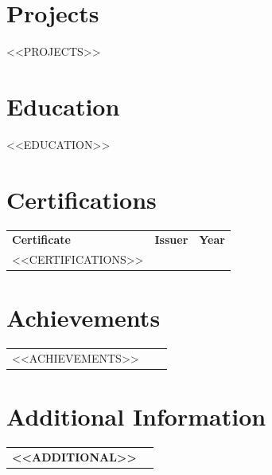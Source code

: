 \documentclass[10pt, a4paper]{article}
\begin{document}
\section*{Projects}

<<PROJECTS>>

\section*{Education}
<<EDUCATION>>

\section*{Certifications}

\renewcommand{\arraystretch}{1.0}
\begin{tabular}{@{} p{8.2cm} >{\centering\arraybackslash}p{7.0cm} >{\raggedleft\arraybackslash}p{2.5cm} @{} }
\textbf{Certificate} & \textbf{Issuer} & \textbf{Year} \\[1pt]
<<CERTIFICATIONS>>
\end{tabular}

\section*{Achievements}

\begin{tabular}{@{} p{8.2cm} >{\centering\arraybackslash}p{7.0cm} >{\raggedleft\arraybackslash}p{2.5cm} @{} }
<<ACHIEVEMENTS>>
\end{tabular}

\section*{Additional Information}

\begin{tabular}{@{} >{\bfseries}p{3.8cm} p{13cm} @{} }
<<ADDITIONAL>>
\end{tabular}
\end{document}
